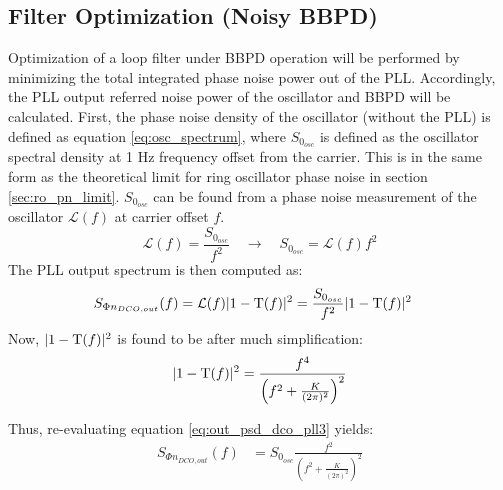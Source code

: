 			\subsection{Filter Optimization (Noisy BBPD)}\label{sec:opt_lf_noisy_bbpd}	
			Optimization of a loop filter under BBPD operation will be performed by minimizing the total integrated phase noise power out of the PLL. Accordingly, the PLL output referred noise power of the oscillator and BBPD will be calculated. First, the phase noise density of the oscillator (without the PLL) is defined as equation \ref{eq:osc_spectrum}, where $S_{0_{osc}}$ is defined as the oscillator spectral density at 1 Hz frequency offset from the carrier. This is in the same form as the theoretical limit for ring oscillator phase noise in section \ref{sec:ro_pn_limit}. $S_{0_{osc}}$ can be found from a phase noise measurement of the oscillator $\mathcal{L}(f)$ at carrier offset $f$.
			\begin{equation}\label{eq:osc_spectrum} 
				\mathcal{L}(f) = \frac{S_{0_{osc}}}{f^2} \hspace{1em}\rightarrow \hspace{1em} S_{0_{osc}} = \mathcal{L}(f)f^2
			\end{equation} 
			The PLL output spectrum is then computed as: 
			\begin{align}\label{eq:out_psd_dco_pll3} 
				S_{\Phi n_{DCO,out}}(f) &= \mathcal{L}(f)|1-\textnormal{T}(f)|^2  =  \frac{S_{0_{osc}}}{f^2}|1-\textnormal{T}(f)|^2  
			\end{align} Now, $|1-\textnormal{T}(f)|^2$ is found to be after much simplification:
			\begin{equation} |1-\textnormal{T}(f)|^2 =
				\frac{f^4}{\left(f^2+\frac{K}{(2\pi)^2}\right)^2} 
			\end{equation} 

			Thus, re-evaluating equation \ref{eq:out_psd_dco_pll3} yields:
			\begin{align}\label{eq:out_psd_dco_pll4} 
				S_{\Phi n_{DCO,out}}(f) &= S_{0_{osc}}\frac{f^2}{\left(f^2+\frac{K}{(2\pi)^2}\right)^2} 
			\end{align} 

